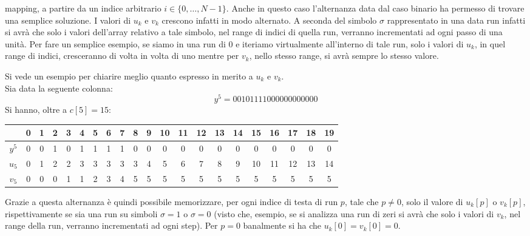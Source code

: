 mapping, a partire da un indice arbitrario $i\in\{0,\ldots,N-1\}$. Anche in
questo caso l'alternanza data dal caso binario ha permesso di trovare una
semplice soluzione. I valori di $u_k$ e $v_k$ crescono infatti in modo
alternato. A seconda del simbolo $\sigma$ rappresentato in una data run infatti
si avrà che solo i valori dell'array relativo a tale simbolo, nel range di
indici di quella run, verranno incrementati ad ogni passo di una unità. Per fare
un semplice esempio, se siamo in una run di 0 e iteriamo virtualmente
all'interno di tale run, solo i valori di $u_k$, in quel
range di indici, cresceranno di volta in volta di uno mentre per $v_k$, nello
stesso range, si avrà sempre lo stesso valore.
\begin{esempio}
  Si vede un esempio per chiarire meglio quanto espresso in merito a $u_k$ e
  $v_k$.\\
  Sia data la seguente colonna:
  \[y^5=00101111000000000000\]
  Si hanno, oltre a $c[5]=15$:
  \begin{table}[H]
    \centering
    \begin{tabular}{c||cc|c|c|cccc|cccccccccccc}
      & 0 & 1 & 2 & 3 & 4 & 5 & 6 & 7 & 8 & 9 & 10 & 11 & 12 & 13 & 14 & 15 & 16
      & 17 & 18 & 19\\
      \hline
      \hline
      $y^5$ & 0 & 0 & 1 & 0 & 1 & 1 & 1 & 1 & 0 & 0 & 0 & 0 & 0 & 0 & 0 & 0 & 0
      & 0 & 0 & 0\\
      \hline
      \hline
      $u_5$ & 0 & 1 & 2 & 2 & 3 & 3 & 3 & 3 & 3 & 4 & 5 & 6 & 7 & 8 & 9 & 10
      & 11 & 12 & 13 & 14\\
      \hline
      $v_5$ & 0 & 0 & 0 & 1 & 1 & 2 & 3 & 4 & 5 & 5 & 5 & 5 & 5 & 5 & 5 & 5 & 5
      & 5 & 5 & 5
    \end{tabular}
  \end{table}
\end{esempio}
Grazie a questa alternanza è quindi possibile memorizzare, per ogni indice di
testa di run $p$, tale che $p\neq 0$, solo il valore di $u_k[p]$ o $v_k[p]$,
rispettivamente se sia una run su simboli $\sigma=1$ o $\sigma=0$ (visto che,
esempio, se si analizza una run di zeri si avrà che solo i valori di $v_k$, nel
range della run, verranno incrementati ad ogni step). Per $p=0$ banalmente si ha
che $u_k[0]=v_k[0]=0$.\\
